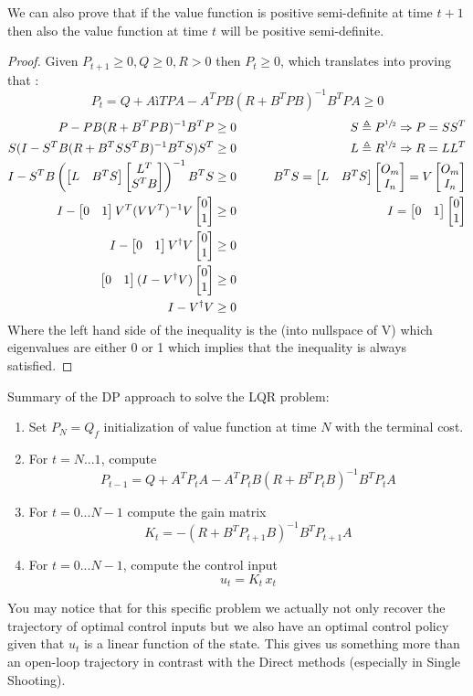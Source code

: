 We can also prove that if the value function is positive semi-definite at time $t+1$ then also the value function at time $t$ will be positive semi-definite.

\begin{proof}
Given $P_{t+1}\ge0 , Q\ge0, R>0$ then $P_t\ge0$, which translates into proving that :
\[P_t = Q + AìTPA - A^TPB(R+B^TPB)^{-1}B^TPA\ge0\]
\begin{align*}
P-PB(R+B^TPB)^{-1}B^TP&\ge 0&\qquad S\triangleq P^{\sfrac{1}{2}}\Rightarrow P = SS^T\\
S(I-S^TB(R+B^TSS^TB)^{-1}B^TS)S^T&\ge0&\qquad L\triangleq R^{\sfrac{1}{2}}\Rightarrow R=LL^T\\
I-S^TB\left(\begin{bmatrix}L&B^TS\end{bmatrix}\begin{bmatrix}L^T\\S^TB\end{bmatrix}\right)^{-1}B^TS&\ge0&\qquad B^TS = \begin{bmatrix}L&B^TS\end{bmatrix}\begin{bmatrix}O_m\\I_n\end{bmatrix} = V\begin{bmatrix}O_m\\I_n\end{bmatrix}\\
I-\begin{bmatrix}0&1\end{bmatrix}V^T(VV^T)^{-1}V\begin{bmatrix}0\\1\end{bmatrix}&\ge0&\qquad I = \begin{bmatrix}0&1\end{bmatrix}\begin{bmatrix}0\\1\end{bmatrix}\\
I-\begin{bmatrix}0&1\end{bmatrix}V^{\dagger}V\begin{bmatrix}0\\1\end{bmatrix}&\ge0&\\
\begin{bmatrix}0&1\end{bmatrix}(I-V^{\dagger}V)\begin{bmatrix}0\\1\end{bmatrix}&\ge0&\\
I-V^{\dagger}V&\ge0&
\end{align*}
Where the left hand side of the inequality is the  (into nullspace of V) which eigenvalues are either 0 or 1 which implies that the inequality is always satisfied.
\end{proof}

Summary of the DP approach to solve the LQR problem:
\begin{enumerate}
\item Set $P_N = Q_f$ initialization of value function at time $N$ with the terminal cost.
\item For $t= N...1$, compute
\[P_{t-1} = Q + A^TP_tA - A^TP_tB(R+B^TP_tB)^{-1}B^TP_tA\]
\item For $t = 0...N-1$ compute the gain matrix
\[K_t = -(R+B^TP_{t+1}B)^{-1} B^TP_{t+1}A\]
\item For $t = 0...N-1$, compute the control input
\[u_t = K_t\,x_t\]
\end{enumerate}
You may notice that for this specific problem we actually not only recover the trajectory of optimal control inputs but we also have an optimal control policy given that $u_t$ is a linear function of the state. This gives us something more than an open-loop trajectory in contrast with the Direct methods (especially in Single Shooting).

